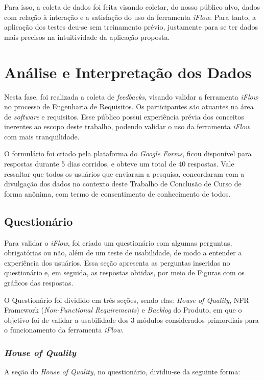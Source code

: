 Para isso, a coleta de dados foi feita visando coletar, do nosso público alvo, dados com relação à interação e a satisfação do uso da ferramenta \textit{iFlow}. Para tanto, a aplicação dos testes deu-se sem treinamento prévio, justamente para se ter dados mais precisos na intuitividade da aplicação proposta. 

\section{Análise e Interpretação dos Dados}
\label{sec:ana_int_dados}
Nesta fase, foi realizada a coleta de \textit{feedbacks}, visando validar a ferramenta \textit{iFlow} no processo de Engenharia de Requisitos. Os participantes são atuantes na área de \textit{software} e requisitos. Esse público possui experiência prévia dos conceitos inerentes ao escopo deste trabalho, podendo validar o uso da ferramenta \textit{iFlow} com mais tranquilidade.

O formulário foi criado pela plataforma do \textit{Google Forms}, ficou disponível para respostas durante 5 dias corridos, e obteve um total de 40 respostas. Vale ressaltar que todos os usuários que enviaram a pesquisa, concordaram com a divulgação dos dados no contexto deste Trabalho de Conclusão de Curso de forma anônima, com termo de consentimento de conhecimento de todos.

\subsection{Questionário}
Para validar o \textit{iFlow}, foi criado um questionário com algumas perguntas, obrigatórias ou não, além de um teste de usabilidade, de modo a entender a experiência dos usuários. Essa seção apresenta as perguntas inseridas no questionário e, em seguida, as respostas obtidas, por meio de Figuras com os gráficos das respostas.

O Questionário foi dividido em três seções, sendo elas: \textit{House of Quality}, NFR Framework (\textit{Non-Functional Requirements}) e \textit{Backlog} do Produto, em que o objetivo foi de validar a usabilidade dos 3 módulos considerados primordiais para o funcionamento da ferramenta \textit{iFlow}.


\subsubsection{\textit{House of Quality}}
A seção do \textit{House of Quality}, no questionário, dividiu-se da seguinte forma:

